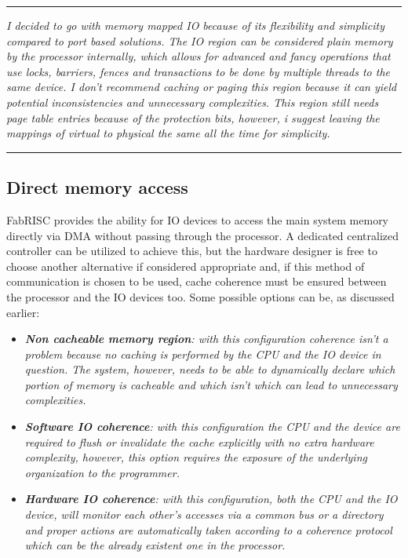         \vspace{10pt}
        
        \vspace{10pt}

    \par\noindent\rule{\textwidth}{0.4pt}
    \textit{I decided to go with memory mapped IO because of its flexibility and simplicity compared to port based solutions. The IO region can be considered plain memory by the processor internally, which allows for advanced and fancy operations that use locks, barriers, fences and transactions to be done by multiple threads to the same device. I don't recommend caching or paging this region because it can yield potential inconsistencies and unnecessary complexities. This region still needs page table entries because of the protection bits, however, i suggest leaving the mappings of virtual to physical the same all the time for simplicity.}
    \par\noindent\rule{\textwidth}{0.4pt}

    \subsection{Direct memory access}

        \vspace{10pt}

        FabRISC provides the ability for IO devices to access the main system memory directly via DMA without passing through the processor. A dedicated centralized controller can be utilized to achieve this, but the hardware designer is free to choose another alternative if considered appropriate and, if this method of communication is chosen to be used, cache coherence must be ensured between the processor and the IO devices too. Some possible options can be, as discussed earlier:

        \begin{itemize}

            \item \textit{\textbf{Non cacheable memory region}: with this configuration coherence isn't a problem because no caching is performed by the CPU and the IO device in question. The system, however, needs to be able to dynamically declare which portion of memory is cacheable and which isn't which can lead to unnecessary complexities.}

            \item \textit{\textbf{Software IO coherence}: with this configuration the CPU and the device are required to flush or invalidate the cache explicitly with no extra hardware complexity, however, this option requires the exposure of the underlying organization to the programmer.}

            \item \textit{\textbf{Hardware IO coherence}: with this configuration, both the CPU and the IO device, will monitor each other's accesses via a common bus or a directory and proper actions are automatically taken according to a coherence protocol which can be the already existent one in the processor.}

        \end{itemize}

